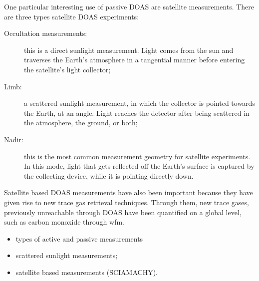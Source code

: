 One particular interesting use of passive \gls{DOAS} are satellite
measurements. There are three types satellite \gls{DOAS} experiments:
\begin{description}
    \item[Occultation measurements:] this is a direct sunlight
        measurement. Light comes from the sun and traverses the Earth's
        atmosphere in a tangential manner before entering the
        satellite's light collector;
    \item[Limb:] a scattered sunlight measurement, in which the
        collector is pointed towards the Earth, at an angle. Light
        reaches the detector after being scattered in the atmosphere,
        the ground, or both;
    \item[Nadir:] this is the most common measurement geometry for
        satellite experiments. In this mode, light that gets reflected
        off the Earth's surface is captured by the collecting device,
        while it is pointing directly down.
\end{description}

Satellite based \gls{DOAS} measurements have also been important because
they have given rise to new trace gas retrieval techniques. Through
them, new trace gases, previously unreachable through \gls{DOAS} have
been quantified on a global level, such as carbon monoxide through
\gls{wfm}.

\begin{itemize}
    \item types of active and passive measurements
    \item scattered sunlight measurements;
    \item satellite based measurements (SCIAMACHY).
\end{itemize}
